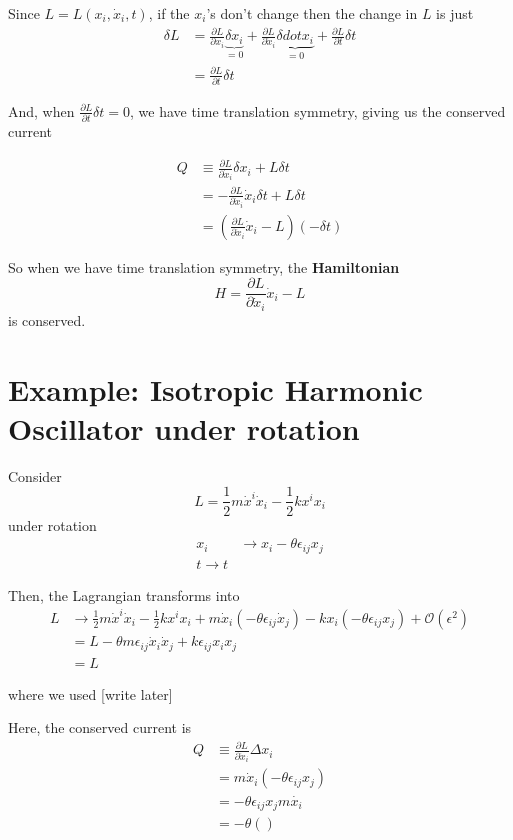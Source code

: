 \documentclass[11pt]{article}
\begin{document}
Since $L = L(x_i, \dot{x}_i, t)$, if the $x_i$'s don't change then the change in $L$ is just 
\begin{align*}
  \delta L &= \frac{\partial L}{\partial x_i} \underbrace{\delta x_i}_{=0} + \frac{\partial L}{\partial \dot{x}_i} \underbrace{\delta dot{x}_i}_{=0} + \frac{\partial L}{\partial t} \delta t \\
  &= \frac{\partial L}{\partial t} \delta t  
\end{align*} 

\vskip 0.5cm
And, when $ \frac{\partial L}{\partial t} \delta t  = 0$, we have time translation symmetry, giving us the conserved current

\begin{align*}
  Q &\equiv  \frac{\partial L}{\partial \dot{x}_i} \delta x_i + L \delta t \\
  &= -  \frac{\partial L}{\partial \dot{x}_i} \dot{x}_i \delta t  +  L \delta t \\
  &= \left(  \frac{\partial L}{\partial \dot{x}_i} \dot{x}_i - L \right) \left(- \delta t\right)
\end{align*}

\vskip 0.5cm
\begin{bluebox}
So when we have time translation symmetry, the \textbf{Hamiltonian}
\[ H =  \frac{\partial L}{\partial \dot{x}_i} \dot{x}_i - L  \]
is conserved.
\end{bluebox}

\vskip 0.5cm
\section{Example: Isotropic Harmonic Oscillator under rotation}
Consider 
\[ L = \frac{1}{2}m \dot{x}^i \dot{x}_i - \frac{1}{2}k x^i x_i \]
under rotation
\begin{align*}
  x_i &\rightarrow x_i - \theta \epsilon_{ij} x_j \\
  t \rightarrow t
\end{align*}

Then, the Lagrangian transforms into 
\begin{align*}
  L &\rightarrow \frac{1}{2}m \dot{x}^i \dot{x}_i - \frac{1}{2}k x^i x_i + m\dot{x}_i \left(-\theta \epsilon_{ij} \dot{x}_j\right) - kx_i \left(-\theta \epsilon_{ij} x_j\right) + \mathcal{O}(\epsilon^2) \\
  &= L - \theta m \epsilon_{ij} \dot{x}_i \dot{x}_j + k \epsilon_{ij} x_{i} x_{j} \\
  &= L
\end{align*}

where we used [write later]

\vskip 0.5cm
Here, the conserved current is 
\begin{align*}
  Q &\equiv \frac{\partial L}{\partial \dot{x}_i} \Delta x_i \\
  &= m \dot{x}_i \left(-\theta \epsilon_{ij} x_{j}\right) \\
  &= -\theta \epsilon_{ij} x_j m\dot{x_i} \\
  &= -\theta \left(\right)
\end{align*}
\end{document}
